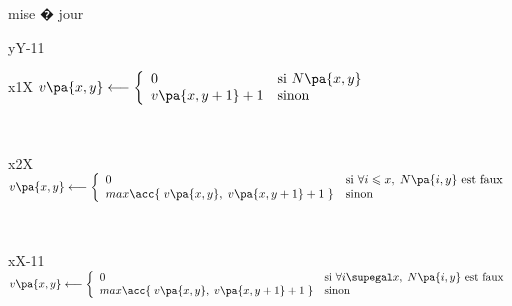 \begin{xalgorithm}
        \begin{xalgostep}{mise � jour}
        \begin{xfor}{y}{Y-1}{1}
            \begin{xfor}{x}{1}{X}
            $v\pa{x,y} \longleftarrow \left\{ \begin{array} {ll}
                                                0                         & \text{si } N\pa{x,y} \\
                                                v\pa{x,y+1}+1 & \text{sinon}
                                                \end{array} \right.$ 
            \end{xfor} \\
            \begin{xfor}{x}{2}{X}
            $v\pa{x,y} \longleftarrow \left\{ \begin{array} {ll}
                                                0                                                                                       & 
                                                                \text{si } \forall i \leqslant x, \; N\pa{i,y} \text{ est faux}\\
                                                max \acc{\; v\pa{x,y}, \; v\pa{x,y+1}+1 \; }        & \text{sinon}
                                                \end{array} \right.$ 
            \end{xfor} \\
            \begin{xfor}{x}{X-1}{1}
            $v\pa{x,y} \longleftarrow \left\{ \begin{array} {ll}
                                                0                                                                                       & 
                                                                \text{si } \forall i \supegal x, \; N\pa{i,y} \text{ est faux}\\
                                                max \acc{\; v\pa{x,y}, \; v\pa{x,y+1}+1 \; }        & \text{sinon}
                                                \end{array} \right.$ 
            \end{xfor}
\end{xfor}
\end{xalgostep}
\end{xalgorithm}
